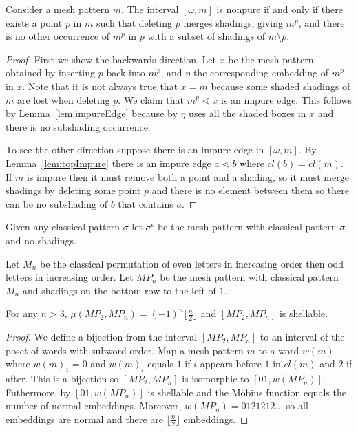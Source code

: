 \documentclass[11pt,a4paper,oneside]{article}
\begin{document}
\begin{prop}
Consider a mesh pattern $m$. The interval $[\omega,m]$ is nonpure if and only if there exists a point $p$ in $m$ such that deleting $p$ merges shadings, giving $m^p$, and there is no other occurrence of $m^p$ in $p$ with a subset of shadings of $m\setminus p$.
\begin{proof}
First we show the backwards direction. Let $x$  be the mesh pattern obtained by inserting $p$ back into $m^p$, and $\eta$ the corresponding embedding of $m^p$ in $x$. Note that it is not always true that $x=m$ because some shaded shadings of $m$ are lost when deleting $p$. We claim that $m^p\lessdot x$ is an impure edge. This follows by Lemma~\ref{lem:impureEdge} because by $\eta$ uses all the shaded boxes in $x$ and there is no subshading occurrence.

To see the other direction suppose there is an impure edge in $[\omega,m]$. By Lemma~\ref{lem:topImpure} there is an impure edge $a\lessdot b$ where $cl(b)=cl(m)$. If $m$ is impure then it must remove both a point and a shading, so it must merge shadings by deleting some point $p$ and there is no element between them so there can be no subshading of $b$ that contains $a$.
\end{proof}
\end{prop}

Given any classical pattern $\sigma$ let $\sigma^\epsilon$ be the mesh pattern with classical pattern $\sigma$ and no shadings.

Let $M_n$ be the classical permutation of even letters in increasing order then odd letters in increasing order. Let $MP_n$ be the mesh pattern with classical pattern $M_n$ and shadings on the bottom row to the left of $1$.

\begin{lem}
For any $n>3$, $\mu(MP_2,MP_n)=(-1)^n\lfloor\frac{n}{2}\rfloor$ and $[MP_2,MP_n]$ is shellable.
\begin{proof}
We define a bijection from the interval $[MP_2,MP_n]$ to an interval of the poset of words with subword order. Map a mesh pattern $m$ to a word $w(m)$ where $w(m)_1=0$ and $w(m)_i$ equals $1$ if $i$ appears before $1$ in $cl(m)$ and $2$ if after. This is a bijection so $[MP_2,MP_n]$ is isomorphic to $[01,w(MP_n)]$. Futhermore, by \cite{Bjo90} $[01,w(MP_n)]$ is shellable and the M\"obius function equals the number of normal embeddings. Moreover, $w(MP_n)=0121212\ldots$ so all embeddings are normal and there are $\lfloor\frac{n}{2}\rfloor$ embeddings.
\end{proof}
\end{lem}
\end{document}
